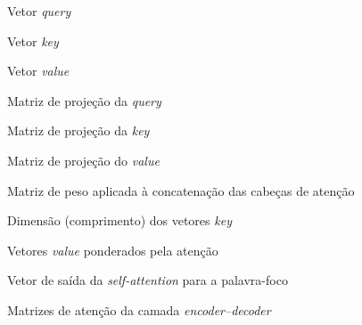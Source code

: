 \begin{simbolos}
  \item[$ q $] Vetor \textit{query}
  \item[$ k $] Vetor \textit{key}
  \item[$ v $] Vetor \textit{value}
  \item[$ W^q $] Matriz de projeção da \textit{query}
  \item[$ W^k $] Matriz de projeção da \textit{key}
  \item[$ W^v $] Matriz de projeção do \textit{value}
  \item[$ W^o $] Matriz de peso aplicada à concatenação das cabeças de atenção
  \item[$ d^k $] Dimensão (comprimento) dos vetores \textit{key}
  \item[$ s $] Vetores \textit{value} ponderados pela atenção
  \item[$ z $] Vetor de saída da \textit{self-attention} para a palavra-foco
  \item[$ K, V $] Matrizes de atenção da camada \textit{encoder--decoder}

\end{simbolos}
